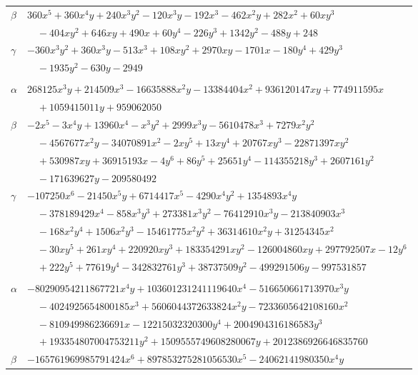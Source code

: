 \documentclass[11pt]{article}
\begin{document}
\begin{longtable}{@{}ll@{}}
$\beta$ & $360x^{5}+360x^{4}y+240x^{3}y^{2}-120x^{3}y-192x^{3}-462x^{2}y+282x^{2}+60xy^{3}$\\
 & $\quad -404xy^{2}+646xy+490x+60y^{4}-226y^{3}+1342y^{2}-488y+248$\\
$\gamma$ & $-360x^{3}y^{2}+360x^{3}y-513x^{3}+108xy^{2}+2970xy-1701x-180y^{4}+429y^{3}$\\
 & $\quad -1935y^{2}-630y-2949$\\
\addlinespace[3pt]
\multicolumn{2}{@{}l}{$\{i,j\}=\{6,149\}$, $k_{ij}=2^{5}\cdot 3^{5}\cdot 5\cdot 7^{3}\cdot 19$}\\
$\alpha$ & $268125x^{3}y+214509x^{3}-16635888x^{2}y-13384404x^{2}+936120147xy+774911595x$\\
 & $\quad +1059415011y+959062050$\\
$\beta$ & $-2x^{5}-3x^{4}y+13960x^{4}-x^{3}y^{2}+2999x^{3}y-5610478x^{3}+7279x^{2}y^{2}$\\
 & $\quad -4567677x^{2}y-34070891x^{2}-2xy^{5}+13xy^{4}+20767xy^{3}-22871397xy^{2}$\\
 & $\quad +530987xy+36915193x-4y^{6}+86y^{5}+25651y^{4}-114355218y^{3}+2607161y^{2}$\\
 & $\quad -171639627y-209580492$\\
$\gamma$ & $-107250x^{6}-21450x^{5}y+6714417x^{5}-4290x^{4}y^{2}+1354893x^{4}y$\\
 & $\quad -378189429x^{4}-858x^{3}y^{3}+273381x^{3}y^{2}-76412910x^{3}y-213840903x^{3}$\\
 & $\quad -168x^{2}y^{4}+1506x^{2}y^{3}-15461775x^{2}y^{2}+36314610x^{2}y+31254345x^{2}$\\
 & $\quad -30xy^{5}+261xy^{4}+220920xy^{3}+183354291xy^{2}-126004860xy+297792507x-12y^{6}$\\
 & $\quad +222y^{5}+77619y^{4}-342832761y^{3}+38737509y^{2}-499291506y-997531857$\\
\addlinespace[3pt]
\multicolumn{2}{@{}l}{$\{i,j\}=\{6,177\}$, $k_{ij}=2^{5}\cdot 3^{5}\cdot 7\cdot 13\cdot 19$}\\
$\alpha$ & $-80290954211867721x^{4}y+103601231241119640x^{4}-516650661713970x^{3}y$\\
 & $\quad -4024925654800185x^{3}+5606044372633824x^{2}y-7233605642108160x^{2}$\\
 & $\quad -810949986236691x-12215032320300y^{4}+2004904316186583y^{3}$\\
 & $\quad +193354807004753211y^{2}+1509555749608280067y+2012386926646835760$\\
$\beta$ & $-165761969985791424x^{6}+897853275281056530x^{5}-24062141980350x^{4}y$\\

\end{longtable}
\end{document}
